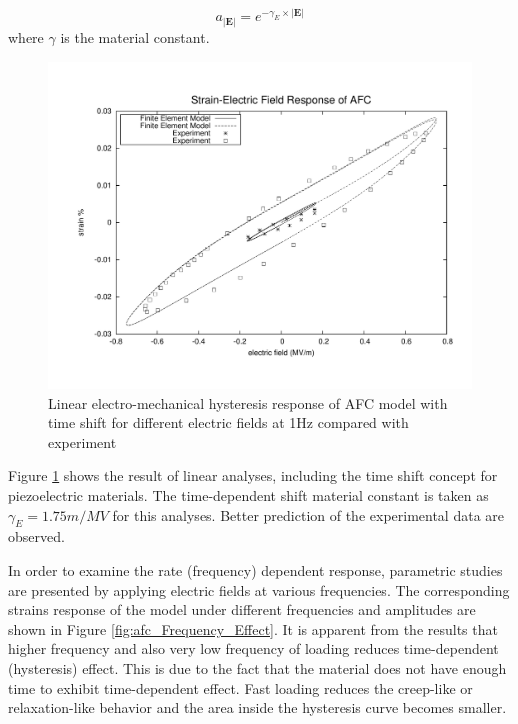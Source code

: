 \begin{equation}
a_{ |\textbf {E}| }=e^{-\gamma_{E} \times |\textbf {E}|}
\label{equation:time_scaling_factor}	
\end{equation}
where $\gamma$ is the material constant.
\begin{figure} 
\centering
\includegraphics[trim = 0mm 0mm 0mm 0mm,width=5.0in]
{./chap_4_structural_analyses/afc_unit_cell/linear_hysteris_time_shift_afc/time_shift_afc_electric_field_vs_strains.pdf}
\caption{Linear electro-mechanical hysteresis response of AFC model with time shift for different electric fields at 1Hz compared with experiment}
\label{fig:time_shift_afc_electric_field_vs_strains}
\end{figure}

Figure \ref{fig:time_shift_afc_electric_field_vs_strains} shows the result of linear analyses, including the time shift concept for piezoelectric materials.
The time-dependent shift material constant is taken as $\gamma_{E}=1.75 m/MV$ for this analyses. Better prediction of the experimental data are observed.

In order to examine the rate (frequency) dependent response, parametric studies are presented by applying electric fields at various frequencies. 
The corresponding strains response of the model under different frequencies and amplitudes are shown in Figure \ref{fig:afc_Frequency_Effect}. 
It is apparent from the results that higher frequency and also very low frequency of loading reduces time-dependent (hysteresis) effect. 
This is due to the fact that the material does not have enough time to exhibit time-dependent effect. 
Fast loading reduces the creep-like or relaxation-like behavior and the area inside the hysteresis curve becomes smaller.

